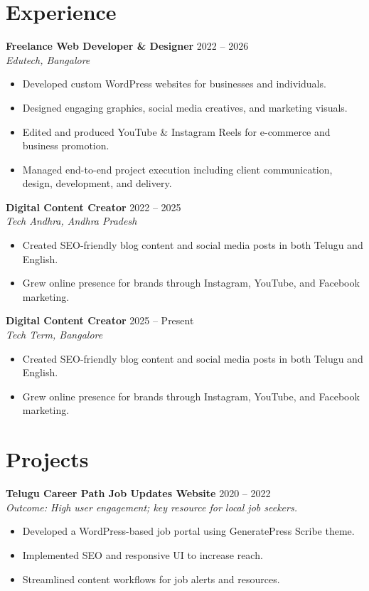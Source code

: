 \documentclass[a4paper,11pt]{article}
\begin{document}
\section*{Experience}
\textbf{Freelance Web Developer & Designer} \hfill 2022 -- 2026 \\
\textit{Edutech, Bangalore}
\begin{itemize}[leftmargin=*, topsep=0.2cm, itemsep=0pt, parsep=0pt]
    \item Developed custom WordPress websites for businesses and individuals.
    \item Designed engaging graphics, social media creatives, and marketing visuals.
    \item Edited and produced YouTube & Instagram Reels for e-commerce and business promotion.
    \item Managed end-to-end project execution including client communication, design, development, and delivery.
\end{itemize}

\vspace{0.2cm}
\textbf{Digital Content Creator} \hfill 2022 -- 2025 \\
\textit{Tech Andhra, Andhra Pradesh}
\begin{itemize}[leftmargin=*, topsep=0.2cm, itemsep=0pt, parsep=0pt]
    \item Created SEO-friendly blog content and social media posts in both Telugu and English.
    \item Grew online presence for brands through Instagram, YouTube, and Facebook marketing.
\end{itemize}

\vspace{0.2cm}
\textbf{Digital Content Creator} \hfill 2025 -- Present \\
\textit{Tech Term, Bangalore}
\begin{itemize}[leftmargin=*, topsep=0.2cm, itemsep=0pt, parsep=0pt]
    \item Created SEO-friendly blog content and social media posts in both Telugu and English.
    \item Grew online presence for brands through Instagram, YouTube, and Facebook marketing.
\end{itemize}

\section*{Projects}
\textbf{Telugu Career Path Job Updates Website} \hfill 2020 -- 2022\\
\textit{Outcome: High user engagement; key resource for local job seekers.}
\begin{itemize}[leftmargin=*, topsep=0.2cm, itemsep=0pt, parsep=0pt]
    \item Developed a WordPress-based job portal using GeneratePress Scribe theme.
    \item Implemented SEO and responsive UI to increase reach.
    \item Streamlined content workflows for job alerts and resources.
\end{itemize}
\end{document}
